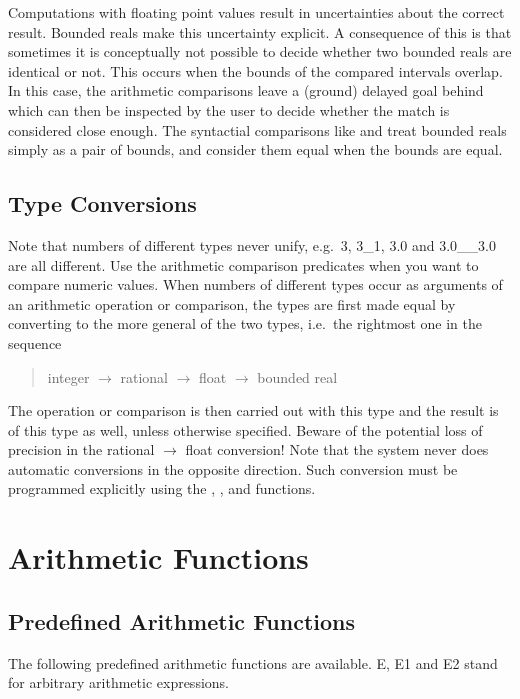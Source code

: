 Computations with floating point values result in uncertainties
about the correct result. Bounded reals make this uncertainty
explicit. A consequence of this is that sometimes it is conceptually
not possible to decide whether two bounded reals are identical or not.
This occurs when the bounds of the compared intervals overlap.
In this case, the arithmetic comparisons leave a (ground) delayed goal
behind which can then be inspected by the user to decide whether the
match is considered close enough. The syntactial comparisons like
 and
 treat bounded reals
simply as a pair of bounds, and consider them equal when the bounds are
equal.


\subsection{Type Conversions}
Note that numbers of different types never unify, e.g.\ 3, 3_1, 3.0
and 3.0__3.0 are all different.
Use the arithmetic comparison predicates when you want to
compare numeric values.
When numbers of different types occur as arguments of an arithmetic
operation or comparison, the types are first made equal by converting
to the more general of the two types, i.e.\ the rightmost one in the sequence
\begin{quote}
integer $\rightarrow$ rational $\rightarrow$ float $\rightarrow$ bounded real
\end{quote}
The operation or comparison is then carried out with this type and the
result is of this type as well, unless otherwise specified.
Beware of the potential loss of precision in the
rational $\rightarrow$ float conversion!
Note that the system never does automatic conversions in the opposite direction.
Such conversion must be programmed explicitly using the
,
,
 and
functions.

\section{Arithmetic Functions}
\subsection{Predefined Arithmetic Functions}
The following predefined arithmetic functions are available.
E, E1 and E2 stand for
arbitrary arithmetic expressions.


